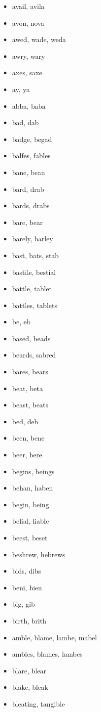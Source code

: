 \documentclass[a4wide,11pt]{report}
\begin{document}
\begin{itemize}
  \item avail, avila
  \item avon, nova
  \item awed, wade, weda
  \item awry, wary
  \item axes, saxe
  \item ay, ya
  \item abba, baba
  \item bad, dab
  \item badge, begad
  \item balfes, fables
  \item bane, bean
  \item bard, drab
  \item bards, drabs
  \item bare, bear
  \item barely, barley
  \item bast, bats, stab
  \item bastile, bestial
  \item battle, tablet
  \item battles, tablets
  \item be, eb
  \item based, beads
  \item beards, sabred
  \item bares, bears
  \item beat, beta
  \item beast, beats
  \item bed, deb
  \item been, bene
  \item beer, bere
  \item begins, beings
  \item behan, haben
  \item begin, being
  \item belial, liable
  \item beest, beset
  \item beshrew, hebrews
  \item bids, dibs
  \item beni, bien
  \item big, gib
  \item birth, brith
  \item amble, blame, lambe, mabel
  \item ambles, blames, lambes
  \item blare, blear
  \item blake, bleak
  \item bleating, tangible

\end{itemize}
\end{document}
